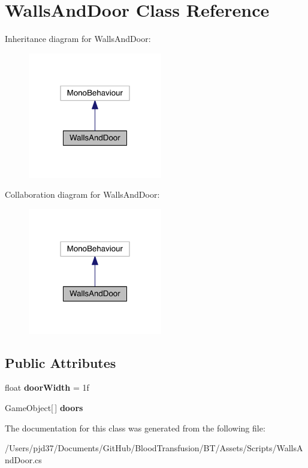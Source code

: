 \hypertarget{class_walls_and_door}{}\section{Walls\+And\+Door Class Reference}
\label{class_walls_and_door}


Inheritance diagram for Walls\+And\+Door\+:\nopagebreak
\begin{figure}[H]
\begin{center}
\leavevmode
\includegraphics[width=166pt]{class_walls_and_door__inherit__graph}
\end{center}
\end{figure}


Collaboration diagram for Walls\+And\+Door\+:\nopagebreak
\begin{figure}[H]
\begin{center}
\leavevmode
\includegraphics[width=166pt]{class_walls_and_door__coll__graph}
\end{center}
\end{figure}
\subsection*{Public Attributes}
\begin{DoxyCompactItemize}
\item 
float {\bfseries door\+Width} = 1f\hypertarget{class_walls_and_door_a3367f992b5fe4cf6c8bd5f7086570a0d}{}\label{class_walls_and_door_a3367f992b5fe4cf6c8bd5f7086570a0d}

\item 
Game\+Object\mbox{[}$\,$\mbox{]} {\bfseries doors}\hypertarget{class_walls_and_door_a45eb11aadf055b6f574bb622f9c1ed22}{}\label{class_walls_and_door_a45eb11aadf055b6f574bb622f9c1ed22}

\end{DoxyCompactItemize}


The documentation for this class was generated from the following file\+:\begin{DoxyCompactItemize}
\item 
/\+Users/pjd37/\+Documents/\+Git\+Hub/\+Blood\+Transfusion/\+B\+T/\+Assets/\+Scripts/Walls\+And\+Door.\+cs\end{DoxyCompactItemize}
